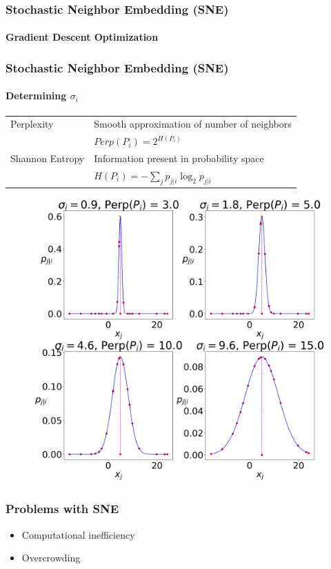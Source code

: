 \documentclass{beamer}
\begin{document}
\begin{frame}
  \frametitle{Stochastic Neighbor Embedding (SNE)}
  \framesubtitle{Gradient Descent Optimization}
\end{frame}

\begin{frame}
  \frametitle{Stochastic Neighbor Embedding (SNE)}
  \framesubtitle{Determining $\sigma_i$}

  \begin{center}
    \small
    
    \begin{tabular}{ll}
      Perplexity & Smooth approximation of number of neighbors\\
      & $Perp(P_i) = 2^{H(P_i)}$\\
      \hline
      Shannon Entropy & Information present in probability space\\
      & $H(P_i) = -\sum_j p_{j|i} \log_2{p_{j|i}}$\\
    \end{tabular}
  \end{center}
  
  \begin{figure}
    \centering
    \includegraphics[height=0.6\textheight]{images/perp/perp.png}
  \end{figure}
\end{frame}

\begin{frame}
  \frametitle{Problems with SNE}

  \begin{itemize}
  \item Computational inefficiency

  \item Overcrowding
  \end{itemize}
\end{frame}
\end{document}
